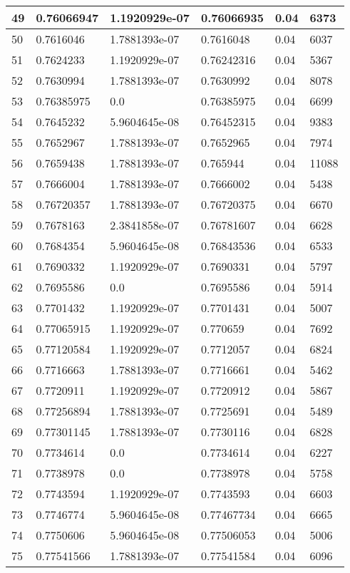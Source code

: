 \begin{longtable}{|l|l|l|l|l|l|}
49 & 0.76066947 & 1.1920929e-07 & 0.76066935 & 0.04 & 6373 \\ \hline 
50 & 0.7616046 & 1.7881393e-07 & 0.7616048 & 0.04 & 6037 \\ \hline 
51 & 0.7624233 & 1.1920929e-07 & 0.76242316 & 0.04 & 5367 \\ \hline 
52 & 0.7630994 & 1.7881393e-07 & 0.7630992 & 0.04 & 8078 \\ \hline 
53 & 0.76385975 & 0.0 & 0.76385975 & 0.04 & 6699 \\ \hline 
54 & 0.7645232 & 5.9604645e-08 & 0.76452315 & 0.04 & 9383 \\ \hline 
55 & 0.7652967 & 1.7881393e-07 & 0.7652965 & 0.04 & 7974 \\ \hline 
56 & 0.7659438 & 1.7881393e-07 & 0.765944 & 0.04 & 11088 \\ \hline 
57 & 0.7666004 & 1.7881393e-07 & 0.7666002 & 0.04 & 5438 \\ \hline 
58 & 0.76720357 & 1.7881393e-07 & 0.76720375 & 0.04 & 6670 \\ \hline 
59 & 0.7678163 & 2.3841858e-07 & 0.76781607 & 0.04 & 6628 \\ \hline 
60 & 0.7684354 & 5.9604645e-08 & 0.76843536 & 0.04 & 6533 \\ \hline 
61 & 0.7690332 & 1.1920929e-07 & 0.7690331 & 0.04 & 5797 \\ \hline 
62 & 0.7695586 & 0.0 & 0.7695586 & 0.04 & 5914 \\ \hline 
63 & 0.7701432 & 1.1920929e-07 & 0.7701431 & 0.04 & 5007 \\ \hline 
64 & 0.77065915 & 1.1920929e-07 & 0.770659 & 0.04 & 7692 \\ \hline 
65 & 0.77120584 & 1.1920929e-07 & 0.7712057 & 0.04 & 6824 \\ \hline 
66 & 0.7716663 & 1.7881393e-07 & 0.7716661 & 0.04 & 5462 \\ \hline 
67 & 0.7720911 & 1.1920929e-07 & 0.7720912 & 0.04 & 5867 \\ \hline 
68 & 0.77256894 & 1.7881393e-07 & 0.7725691 & 0.04 & 5489 \\ \hline 
69 & 0.77301145 & 1.7881393e-07 & 0.7730116 & 0.04 & 6828 \\ \hline 
70 & 0.7734614 & 0.0 & 0.7734614 & 0.04 & 6227 \\ \hline 
71 & 0.7738978 & 0.0 & 0.7738978 & 0.04 & 5758 \\ \hline 
72 & 0.7743594 & 1.1920929e-07 & 0.7743593 & 0.04 & 6603 \\ \hline 
73 & 0.7746774 & 5.9604645e-08 & 0.77467734 & 0.04 & 6665 \\ \hline 
74 & 0.7750606 & 5.9604645e-08 & 0.77506053 & 0.04 & 5006 \\ \hline 
75 & 0.77541566 & 1.7881393e-07 & 0.77541584 & 0.04 & 6096 \\ \hline 
\end{longtable}